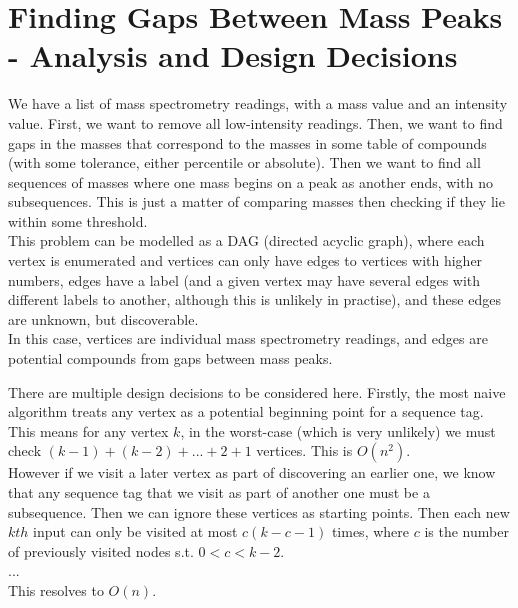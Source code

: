 \documentclass{article}
\begin{document}
\section*{Finding Gaps Between Mass Peaks - Analysis and Design Decisions}

We have a list of mass spectrometry readings, with a mass value and an intensity value.
First, we want to remove all low-intensity readings.
Then, we want to find gaps in the masses that correspond to the masses in some table of compounds (with some tolerance, either percentile or absolute).
Then we want to find all sequences of masses where one mass begins on a peak as another ends, with no subsequences. 
This is just a matter of comparing masses then checking if they lie within some threshold. \\

This problem can be modelled as a DAG (directed acyclic graph), where each vertex is enumerated and vertices can only have edges to vertices with higher numbers,
edges have a label (and a given vertex may have several edges with different labels to another, although this is unlikely in practise), and these edges are unknown,
but discoverable. \\

In this case, vertices are individual mass spectrometry readings, and edges are potential compounds from gaps between mass peaks.

There are multiple design decisions to be considered here. 
Firstly, the most naive algorithm treats any vertex as a potential beginning point for a sequence tag.
This means for any vertex \(k\), in the worst-case (which is very unlikely) we must check \((k-1)+(k-2)+... +2+1\) vertices.
This is \(O(n^2)\). \\

However if we visit a later vertex as part of discovering an earlier one, we know that any sequence tag that we visit as part of another one must be a subsequence.
Then we can ignore these vertices as starting points.
Then each new \(kth\) input can only be visited at most \(c(k-c-1)\) times, where \(c\) is the number of previously visited nodes s.t. \(0<c<k-2\). \\
... \\
This resolves to \(O(n)\). \\
\end{document}
